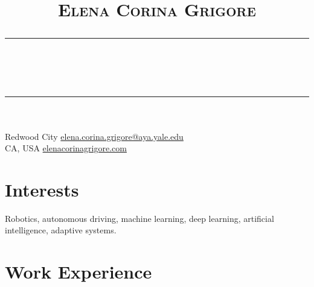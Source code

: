 \documentclass[10pt,letterpaper]{article}
\title{\vspace{-5em}
	\Huge{\textsc{Elena Corina Grigore}}
	\vspace{-0.5em}
	\\\noindent\rule{\linewidth}{0.5pt}
	\vspace{-2.5em}
	\\\noindent\rule{\linewidth}{0.5pt}
	\vspace{-3.2em}
}
\date{}
\begin{document}
\maketitle
\thispagestyle{fancy}




Redwood City \hfill \href{mailto:elena.corina.grigore@aya.yale.edu}{elena.corina.grigore@aya.yale.edu}\\
CA, USA \hfill \href{http://elenacorinagrigore.com}{elenacorinagrigore.com}

\vspace{-0.5em}
\section{Interests}
\vspace{-0.5em}
Robotics, autonomous driving, machine learning, deep learning, artificial intelligence, adaptive systems.
	
\vspace{-1em}
\section{Work Experience}
\end{document}
